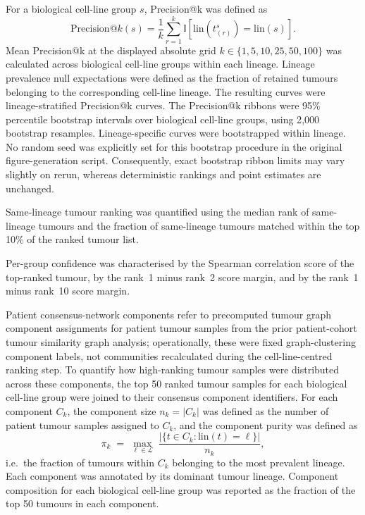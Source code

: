 For a biological cell-line group \(s\), Precision@k was defined as
\[
\mathrm{Precision@}k(s) =
\frac{1}{k}\sum_{r=1}^{k}
\mathbb{I}\!\left[\mathrm{lin}\!\left(t_{(r)}^{s}\right)=\mathrm{lin}(s)\right].
\]
Mean Precision@k at the displayed absolute grid
\(k \in \{1,5,10,25,50,100\}\) was calculated across
biological cell-line groups within each lineage. Lineage prevalence null expectations
were defined as the fraction of retained tumours belonging to the corresponding
cell-line lineage. The resulting curves were lineage-stratified Precision@k
curves. The Precision@k ribbons were 95\% percentile bootstrap
intervals over biological cell-line groups, using 2{,}000 bootstrap resamples.
Lineage-specific curves were bootstrapped within lineage. No random seed was
explicitly set for this bootstrap procedure in the original figure-generation
script. Consequently, exact bootstrap ribbon limits may vary slightly on rerun,
whereas deterministic rankings and point estimates are unchanged.

Same-lineage tumour ranking was quantified using the median rank of
same-lineage tumours and the fraction of same-lineage tumours matched within
the top 10\% of the ranked tumour list.

Per-group confidence was characterised by the Spearman correlation score of the top-ranked tumour, by the rank~1 minus rank~2 score margin, and by the rank~1 minus rank~10 score margin.

Patient consensus-network components refer to precomputed tumour graph
component assignments for patient tumour samples from the prior patient-cohort
tumour similarity graph analysis; operationally, these were fixed
graph-clustering component labels, not communities recalculated during the
cell-line-centred ranking step.
To quantify how high-ranking tumour samples were distributed across these
components, the top 50 ranked tumour samples for each biological cell-line
group were joined to their consensus component identifiers. For each component
$C_k$, the component size $n_k = |C_k|$ was defined
as the number of patient tumour samples assigned to $C_k$, and the component
purity was defined as
\[
\pi_k \;=\; \max_{\ell \in \mathcal{L}}\; \frac{|\{ t \in C_k : \mathrm{lin}(t) = \ell \}|}{n_k},
\]
i.e.\ the fraction of tumours within $C_k$ belonging to the most prevalent
lineage. Each component was annotated by its dominant tumour lineage. Component
composition for each biological cell-line group was reported as the fraction of
the top 50 tumours in each component.


